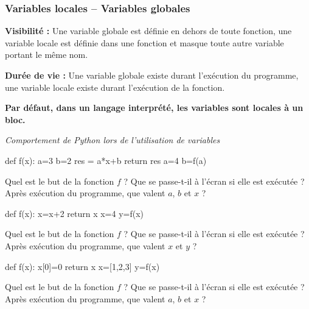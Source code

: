 \documentclass[10pt]{article}
\begin{document}
\subsubsection{Variables locales -- Variables globales}
\begin{defi}
\textbf{Visibilité :} Une variable globale est définie en dehors de toute fonction, une variable locale est définie dans une fonction et masque toute autre variable portant le même nom.

\textbf{Durée de vie :} Une variable globale existe durant l'exécution du programme, une variable locale existe durant l'exécution de la fonction.

\textbf{Par défaut, dans un langage interprété, les variables sont locales à un bloc.}
\end{defi}


\begin{exemple}

\textit{Comportement de Python lors de l'utilisation de variables}

\begin{minipage}[t]{.2\linewidth}
\begin{py}
\begin{python}
def f(x):
    a=3
    b=2
    res = a*x+b
    return res
a=4
b=f(a)
\end{python}
\end{py}
\end{minipage} \hfill
\begin{minipage}[t]{.78\linewidth}
Quel est le but de la fonction $f$ ? Que se passe-t-il à l'écran si elle est exécutée ? Après exécution du programme, que valent $a$, $b$ et $x$ ?
\end{minipage}

\begin{minipage}[t]{.2\linewidth}
\begin{py}
\begin{python}
def f(x):
    x=x+2
    return x
x=4
y=f(x)
\end{python}
\end{py}
\end{minipage} \hfill
\begin{minipage}[t]{.78\linewidth}
Quel est le but de la fonction $f$ ? Que se passe-t-il à l'écran si elle est exécutée ? Après exécution du programme, que valent $x$ et $y$ ?
\end{minipage}

\begin{minipage}[t]{.2\linewidth}
\begin{py}
\begin{python}
def f(x):
    x[0]=0
    return x
x=[1,2,3]
y=f(x)
\end{python}
\end{py}
\end{minipage} \hfill
\begin{minipage}[t]{.78\linewidth}
Quel est le but de la fonction $f$ ? Que se passe-t-il à l'écran si elle est exécutée ? Après exécution du programme, que valent $a$, $b$ et $x$ ?
\end{minipage}

\end{exemple}
\end{document}
